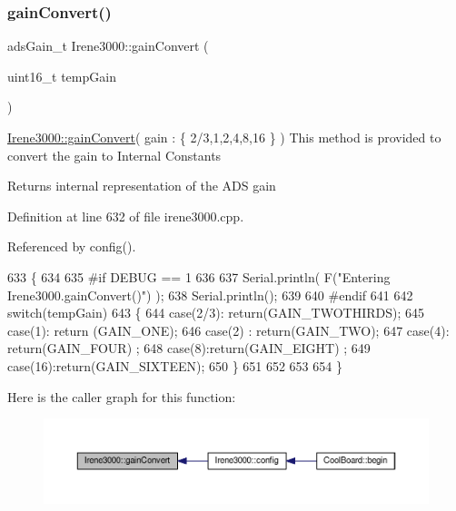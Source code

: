 \subsubsection{\texorpdfstring{gain\+Convert()}{gainConvert()}}
{\footnotesize\ttfamily ads\+Gain\+\_\+t Irene3000\+::gain\+Convert (\begin{DoxyParamCaption}\item[{uint16\+\_\+t}]{temp\+Gain }\end{DoxyParamCaption})}

\hyperlink{classIrene3000_abcad62d1201a59f8dd3ba87048002728}{Irene3000\+::gain\+Convert}( gain \+: \{ 2/3,1,2,4,8,16 \} ) This method is provided to convert the gain to Internal Constants

\begin{DoxyReturn}{Returns}
internal representation of the A\+DS gain 
\end{DoxyReturn}


Definition at line 632 of file irene3000.\+cpp.



Referenced by config().


\begin{DoxyCode}
633 \{
634 
635 \textcolor{preprocessor}{#if DEBUG == 1 }
636 
637     Serial.println( F(\textcolor{stringliteral}{"Entering Irene3000.gainConvert()"}) );
638     Serial.println();
639 
640 \textcolor{preprocessor}{#endif }
641     
642     \textcolor{keywordflow}{switch}(tempGain)
643     \{
644         \textcolor{keywordflow}{case}(2/3): \textcolor{keywordflow}{return}(GAIN\_TWOTHIRDS);
645         \textcolor{keywordflow}{case}(1): \textcolor{keywordflow}{return} (GAIN\_ONE);
646         \textcolor{keywordflow}{case}(2) : \textcolor{keywordflow}{return}(GAIN\_TWO);
647         \textcolor{keywordflow}{case}(4): \textcolor{keywordflow}{return}(GAIN\_FOUR) ;   
648         \textcolor{keywordflow}{case}(8):\textcolor{keywordflow}{return}(GAIN\_EIGHT)  ;  
649         \textcolor{keywordflow}{case}(16):\textcolor{keywordflow}{return}(GAIN\_SIXTEEN);  
650     \}
651 
652 
653 
654 \}
\end{DoxyCode}
Here is the caller graph for this function\+:\nopagebreak
\begin{figure}[H]
\begin{center}
\leavevmode
\includegraphics[width=350pt]{classIrene3000_abcad62d1201a59f8dd3ba87048002728_icgraph}
\end{center}
\end{figure}
\mbox{\label{classIrene3000_a7bc2414100b5e19eacc6630fa34b2654}} 
